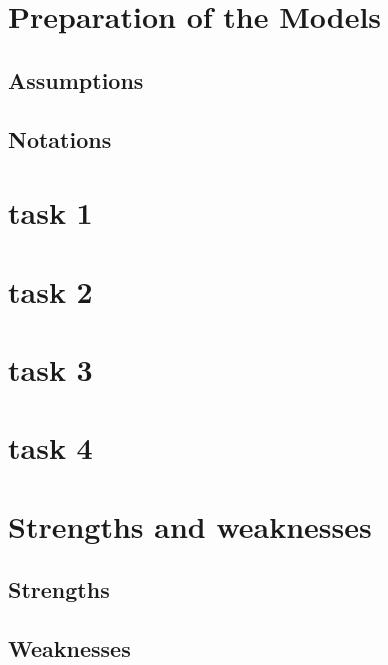 \documentclass{mcmthesis}
\begin{document}
\section{Preparation of the Models}
\subsection{Assumptions}

\subsection{Notations}

\section{task 1}

\section{task 2}

\section{task 3}

\section{task 4}

\section{Strengths and weaknesses}

\subsection{Strengths}

\subsection{Weaknesses}

\newpage



\end{document}
